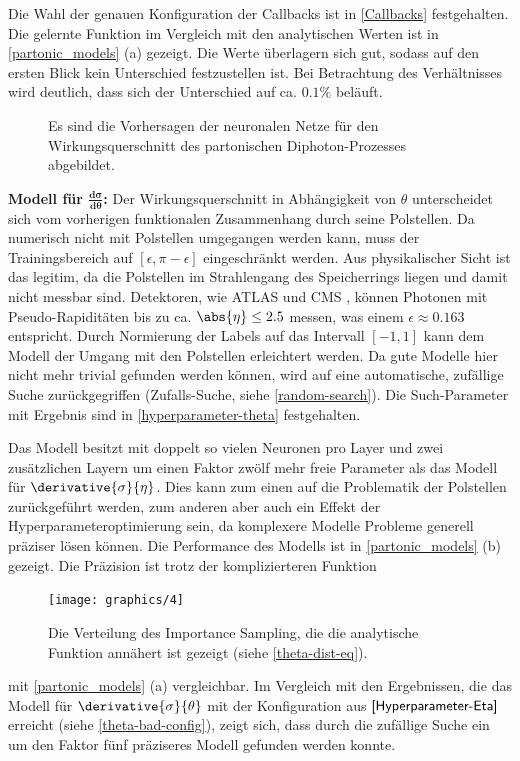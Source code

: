 Die Wahl der genauen Konfiguration der Callbacks ist in \textsf{\autoref{Callbacks}} festgehalten.
Die gelernte Funktion im Vergleich mit den analytischen Werten ist in \textsf{\autoref{partonic_models} (a)}  gezeigt. Die Werte überlagern sich gut, sodass auf den ersten Blick kein Unterschied festzustellen ist. Bei Betrachtung des Verhältnisses wird deutlich, dass sich der Unterschied auf ca. $0.1\%$ beläuft. 
\begin{figure}[hbt]
	\centering
	\caption{Es sind die Vorhersagen der neuronalen Netze für den Wirkungsquerschnitt des partonischen Diphoton-Prozesses abgebildet.}
	\label{partonic_models}
\end{figure}

\textbf{Modell für $\mathbf{\frac{d\sigma}{d\theta}}$:}
Der Wirkungsquerschnitt in Abhängigkeit von $\theta$ unterscheidet sich vom vorherigen funktionalen Zusammenhang durch seine Polstellen. Da numerisch nicht mit Polstellen umgegangen werden kann, muss der Trainingsbereich auf $[\epsilon, \pi-\epsilon]$ eingeschränkt werden. Aus physikalischer Sicht ist das legitim, da die Polstellen im Strahlengang des Speicherrings liegen und damit nicht messbar sind. Detektoren, wie ATLAS \cite{ATLAS} und CMS \cite{CMS}, können Photonen mit Pseudo-Rapiditäten bis zu ca. $\abs{\eta} \leq 2.5$ messen, was einem $\epsilon \approx 0.163$ entspricht. Durch Normierung der Labels auf das Intervall $[-1, 1]$ kann dem Modell der Umgang mit den Polstellen erleichtert werden. Da gute Modelle hier nicht mehr trivial gefunden werden können, wird auf eine automatische, zufällige Suche zurückgegriffen (Zufalls-Suche, siehe \textsf{\autoref{random-search}}). Die Such-Parameter mit Ergebnis sind in \textsf{\autoref{hyperparameter-theta}} festgehalten.

Das Modell besitzt mit doppelt so vielen Neuronen pro Layer und zwei zusätzlichen Layern um einen Faktor zwölf mehr freie Parameter als das Modell für $\derivative{\sigma}{\eta}$. Dies kann zum einen auf die Problematik der Polstellen zurückgeführt werden, zum anderen aber auch ein Effekt der Hyperparameteroptimierung sein, da komplexere Modelle Probleme generell präziser lösen können. Die Performance des Modells ist in \textsf{\autoref{partonic_models} (b)} gezeigt. Die Präzision ist trotz der komplizierteren Funktion
\begin{figure}
	\centering
	\texttt{[image: graphics/4]}
	\caption{Die Verteilung des Importance Sampling, die die analytische Funktion annähert ist gezeigt (siehe \textsf{\autoref{theta-dist-eq}}).}
	\label{theta-dist}
\end{figure}
 mit \textsf{\autoref{partonic_models} (a)} vergleichbar. Im Vergleich mit den Ergebnissen, die das Modell für $\derivative{\sigma}{\theta}$ mit der Konfiguration aus $\textsf{\autoref{Hyperparameter-Eta}}$ erreicht (siehe \textsf{\autoref{theta-bad-config}}), zeigt sich, dass durch die zufällige Suche ein um den Faktor fünf präziseres Modell gefunden werden konnte.

